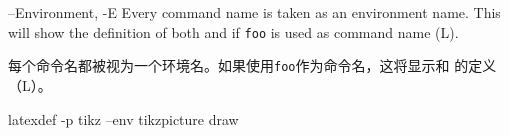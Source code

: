 \begin{docKey}
{--Environment, -E}{}%
{}%
Every command name is taken as an environment name. This will show the definition of
both  and  if \texttt{foo} is used as command name (L).

每个命令名都被视为一个环境名。如果使用\texttt{foo}作为命令名，这将显示和 的定义（L）。
\begin{commandshell} 
latexdef -p tikz --env tikzpicture draw
\end{commandshell}
\end{docKey}


